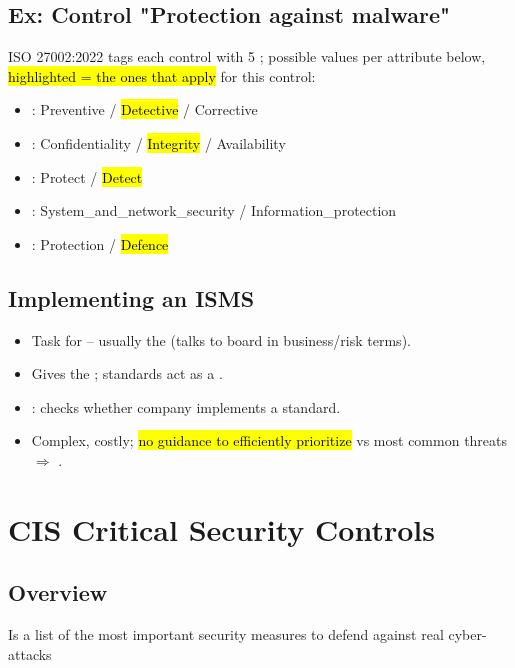 \subsection{Ex: Control "Protection against malware"}
ISO 27002:2022 tags each control with 5 ; possible values per attribute below, \hl{highlighted = the ones that apply} for this control:
\begin{itemize}
\item {}: Preventive / \hl{Detective} / Corrective
\item {}: Confidentiality / \hl{Integrity} / Availability
\item {}: Protect / \hl{Detect}
\item {}: System\_and\_network\_security / Information\_protection
\item {}: Protection / \hl{Defence}
\end{itemize}

\subsection{Implementing an ISMS}
\begin{itemize}
\item Task for  -- usually the  (talks to board in business/risk terms).
\item Gives the ; standards act as a .
\item {}: checks whether company implements a standard.
\item Complex, costly; \hl{no guidance to efficiently prioritize} vs most common threats $\Rightarrow$ .
\end{itemize}

\section{CIS Critical Security Controls}

\subsection{Overview}
Is a list of the most important security measures to defend against real cyber-attacks


